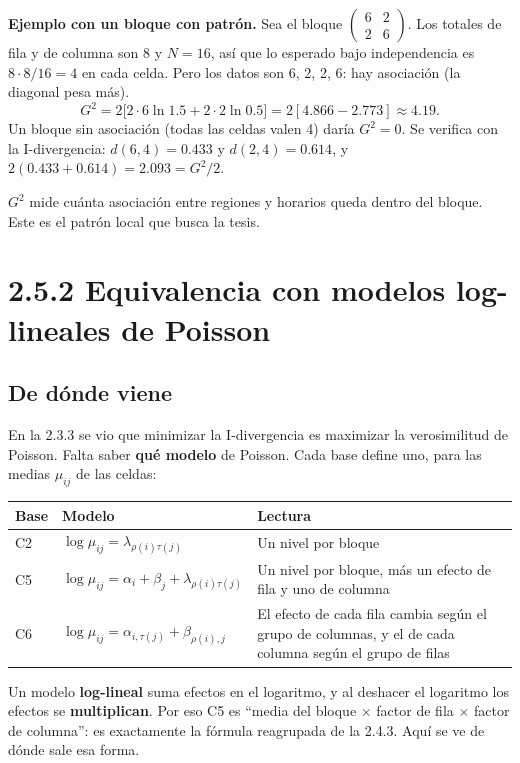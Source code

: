 \documentclass[11pt,a4paper]{article}
\newenvironment{idea}{\par\begin{center}\begin{lrbox}{\ideabox}\begin{minipage}{0.9\linewidth}}{\end{minipage}\end{lrbox}\fcolorbox{blue!40!black}{blue!5}{\usebox{\ideabox}}\end{center}}
\begin{document}
\textbf{Ejemplo con un bloque con patrón.} Sea el bloque
$\begin{pmatrix}6&2\\2&6\end{pmatrix}$. Los totales de fila y de columna son 8 y
$N=16$, así que lo esperado bajo independencia es $8\cdot8/16=4$ en cada celda.
Pero los datos son 6, 2, 2, 6: hay asociación (la diagonal pesa más).
\[
  G^2=2\bigl[2\cdot6\ln1.5+2\cdot2\ln0.5\bigr]=2[4.866-2.773]\approx\mathbf{4.19}.
\]
Un bloque sin asociación (todas las celdas valen 4) daría $G^2=0$. Se verifica con
la I-divergencia: $d(6,4)=0.433$ y $d(2,4)=0.614$, y $2(0.433+0.614)=2.093=G^2/2$.

\begin{idea}
$G^2$ mide cuánta asociación entre regiones y horarios queda dentro del bloque.
Este es el patrón local que busca la tesis.
\end{idea}

\section{2.5.2 Equivalencia con modelos log-lineales de Poisson}

\subsection{De dónde viene}

En la 2.3.3 se vio que minimizar la I-divergencia es maximizar la verosimilitud de
Poisson. Falta saber \textbf{qué modelo} de Poisson. Cada base define uno, para las
medias $\mu_{ij}$ de las celdas:
\begin{center}
\renewcommand{\arraystretch}{1.3}
\begin{tabular}{@{}l>{\raggedright\arraybackslash}p{5.2cm}>{\raggedright\arraybackslash}p{6.4cm}@{}}
\toprule
\textbf{Base} & \textbf{Modelo} & \textbf{Lectura} \\
\midrule
C2 & $\log\mu_{ij}=\lambda_{\rho(i)\tau(j)}$ & Un nivel por bloque \\
\midrule
C5 & $\log\mu_{ij}=\alpha_i+\beta_j+\lambda_{\rho(i)\tau(j)}$ & Un nivel por bloque, más un efecto de fila y uno de columna \\
\midrule
C6 & $\log\mu_{ij}=\alpha_{i,\tau(j)}+\beta_{\rho(i),j}$ & El efecto de cada fila cambia según el grupo de columnas, y el de cada columna según el grupo de filas \\
\bottomrule
\end{tabular}
\end{center}
Un modelo \textbf{log-lineal} suma efectos en el logaritmo, y al deshacer el
logaritmo los efectos se \textbf{multiplican}. Por eso C5 es ``media del bloque
$\times$ factor de fila $\times$ factor de columna'': es exactamente la fórmula
reagrupada de la 2.4.3. Aquí se ve de dónde sale esa forma.
\end{document}
